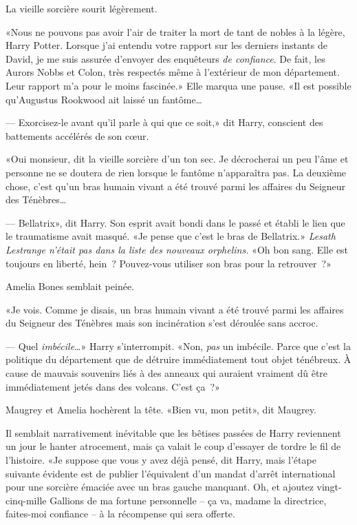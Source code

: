 La vieille sorcière sourit légèrement.

«Nous ne pouvons pas avoir l'air de traiter la mort de tant de nobles à la légère, Harry Potter. Lorsque j'ai entendu votre rapport sur les derniers instants de David, je me suis assurée d'envoyer des enquêteurs \emph{de confiance}. De fait, les Aurors Nobbs et Colon, très respectés même à l'extérieur de mon département. Leur rapport m'a pour le moins fascinée.» Elle marqua une pause. «Il est possible qu'Augustus Rookwood ait laissé un fantôme…

--- Exorcisez-le avant qu'il parle à qui que ce soit,» dit Harry, conscient des battements accélérés de son cœur.

«Oui monsieur, dit la vieille sorcière d'un ton sec. Je décrocherai un peu l'âme et personne ne se doutera de rien lorsque le fantôme n'apparaîtra pas. La deuxième chose, c'est qu'un bras humain vivant a été trouvé parmi les affaires du Seigneur des Ténèbres…

--- Bellatrix», dit Harry. Son esprit avait bondi dans le passé et établi le lien que le traumatisme avait masqué. «Je pense que c'est le bras de Bellatrix.» \emph{Lesath Lestrange n'était pas dans la liste des nouveaux orphelins.} «Oh bon sang. Elle est toujours en liberté, hein~? Pouvez-vous utiliser son bras pour la retrouver~?»

Amelia Bones semblait peinée.

«Je vois. Comme je disais, un bras humain vivant a été trouvé parmi les affaires du Seigneur des Ténèbres mais son incinération s'est déroulée sans accroc.

--- Quel \emph{imbécile}…» Harry s'interrompit. «Non, \emph{pas} un imbécile. Parce que c'est la politique du département que de détruire immédiatement tout objet ténébreux. À cause de mauvais souvenirs liés à des anneaux qui auraient vraiment dû être immédiatement jetés dans des volcans. C'est ça~?»

Maugrey et Amelia hochèrent la tête. «Bien vu, mon petit», dit Maugrey.

Il semblait narrativement inévitable que les bêtises passées de Harry reviennent un jour le hanter atrocement, mais ça valait le coup d'essayer de tordre le fil de l'histoire. «Je suppose que vous y avez déjà pensé, dit Harry, mais l'étape suivante évidente est de publier l'équivalent d'un mandat d'arrêt international pour une sorcière émaciée avec un bras gauche manquant. Oh, et ajoutez vingt-cinq-mille Gallions de ma fortune personnelle -- ça va, madame la directrice, faites-moi confiance -- à la récompense qui sera offerte.


